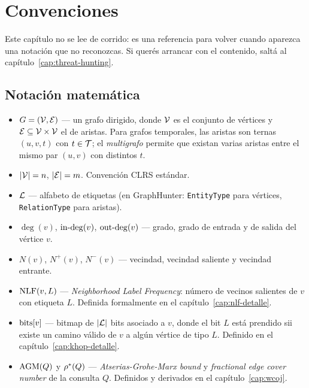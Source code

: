 \chapter*{Convenciones}
\label{cap:notacion-pseudocodigo}

Este capítulo no se lee de corrido: es una referencia para volver
cuando aparezca una notación que no reconozcas. Si querés arrancar
con el contenido, saltá al capítulo~\ref{cap:threat-hunting}.

\section*{Notación matemática}

\begin{itemize}
    \item \(G = (\mathcal{V}, \mathcal{E})\) — un grafo dirigido, donde \(\mathcal{V}\) es el
    conjunto de vértices y \(\mathcal{E} \subseteq \mathcal{V} \times \mathcal{V}\) el de aristas.
    Para grafos temporales, las aristas son ternas \((u, v, t)\) con
    \(t \in \mathcal{T}\); el \emph{multigrafo} permite que existan varias
    aristas entre el mismo par \((u, v)\) con distintos \(t\).
    \item \(|\mathcal{V}| = n\), \(|\mathcal{E}| = m\). Convención CLRS estándar.
    \item \(\mathcal{L}\) — alfabeto de etiquetas (en GraphHunter:
    \texttt{EntityType} para vértices, \texttt{RelationType} para
    aristas).
    \item \(\deg(v)\), \(\mathrm{in\text{-}deg}(v)\), \(\mathrm{out\text{-}deg}(v)\) — grado, grado de
    entrada y de salida del vértice \(v\).
    \item \(N(v)\), \(N^{+}(v)\), \(N^{-}(v)\) — vecindad, vecindad
    saliente y vecindad entrante.
    \item \(\mathrm{NLF}(v, L)\) — \emph{Neighborhood Label Frequency}: número
    de vecinos salientes de \(v\) con etiqueta \(L\). Definida
    formalmente en el capítulo~\ref{cap:nlf-detalle}.
    \item \(\mathrm{bits}[v]\) — bitmap de \(|\mathcal{L}|\) bits asociado a \(v\),
    donde el bit \(L\) está prendido sii existe un camino válido de
    \(v\) a algún vértice de tipo \(L\). Definido en el
    capítulo~\ref{cap:khop-detalle}.
    \item \(\mathrm{AGM}(Q)\) y \(\rho^{*}(Q)\) — \emph{Atserias-Grohe-Marx
    bound} y \emph{fractional edge cover number} de la consulta \(Q\).
    Definidos y derivados en el capítulo~\ref{cap:wcoj}.
\end{itemize}

